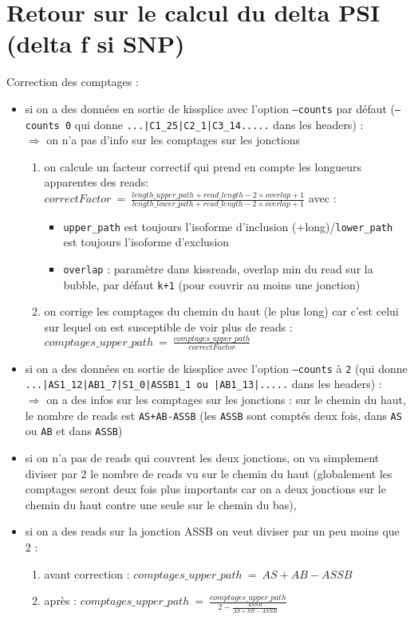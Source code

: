 \documentclass[a4paper,10pt]{article}
\begin{document}
\section{Retour sur le calcul du delta PSI (delta f si SNP)}
Correction des comptages :
\begin{itemize}
 \item si on a des données en sortie de kissplice avec l'option \texttt{--counts} par défaut (\texttt{--counts 0} qui donne \texttt{...|C1\_25|C2\_1|C3\_14.....} dans les headers) :\\
  $\Rightarrow$ on n'a pas d'info sur les comptages sur les jonctions
 \begin{enumerate}
 \item on calcule un facteur correctif qui prend en compte les longueurs apparentes des reads:\\
   $correctFactor\:=\: \frac{length\_upper\_path + read\_length - 2 \times overlap + 1}{length\_lower\_path + read\_length - 2\times overlap + 1}$ avec :
 \begin{itemize}
  \item \texttt{upper\_path} est toujours l'isoforme d'inclusion (+long)/\texttt{lower\_path} est toujours l'isoforme d'exclusion
  \item \texttt{overlap} : paramètre dans kissreads, overlap min du read sur la bubble, par défaut \texttt{k+1} (pour couvrir au moins une jonction)
   \end{itemize}
            \item on corrige les comptages du chemin du haut (le plus long) car c'est celui sur lequel on est susceptible de voir plus de reads :\\
            $comptages\_upper\_path \:=\:  \frac{comptages\_upper\_path}{correctFactor} $
 \end{enumerate}
 \item si on a des données en sortie de kissplice avec l'option \texttt{--counts} à \texttt{2} (qui donne \texttt{...|AS1\_12|AB1\_7|S1\_0|ASSB1\_1 ou |AB1\_13|.....} dans les headers) :\\
 $\Rightarrow$ on a des infos sur les comptages sur les jonctions : sur le chemin du haut, le nombre de reads est \texttt{AS+AB-ASSB} (les \texttt{ASSB} sont comptés deux fois, dans \texttt{AS} ou \texttt{AB} et dans \texttt{ASSB})
  \item si on n'a pas de reads qui couvrent les deux jonctions, on va simplement diviser par 2 le nombre de reads vu sur le chemin du haut (globalement les comptages seront deux fois plus importants car on a deux jonctions sur le chemin du haut contre une seule sur le chemin du bas), 
  \item si on a des reads sur la jonction ASSB on veut diviser par un peu moins que 2 :
  \begin{enumerate}
    \item avant correction : $comptages\_upper\_path \:=\: AS+AB-ASSB $
    \item après : $comptages\_upper\_path\:=\:\frac{comptages\_upper\_path}{2-\frac{ASSB}{AS+SB-ASSB}}$
  \end{enumerate}
 \end{itemize}
 
\end{document}
